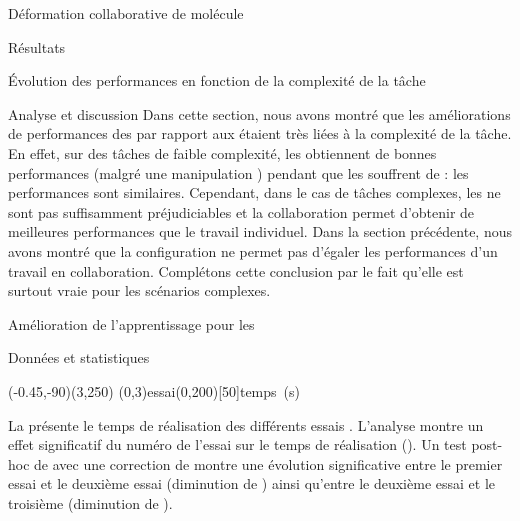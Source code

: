 \documentclass[myfrancais,ngerman,english,frenchb]{mythesis}
\begin{document}
\begin{mychapter}{Déformation collaborative de molécule}
\begin{mysection}{Résultats}
\begin{mysubsection}{Évolution des performances en fonction de la complexité de la tâche}
\begin{mysubsubsection}{Analyse et discussion}
					Dans cette section, nous avons montré que les améliorations de performances des  par rapport aux  étaient très liées à la complexité de la tâche.
					En effet, sur des tâches de faible complexité, les  obtiennent de bonnes performances (malgré une manipulation ) pendant que les  souffrent de  : les performances sont similaires.
					Cependant, dans le cas de tâches complexes, les  ne sont pas suffisamment préjudiciables et la collaboration permet d'obtenir de meilleures performances que le travail individuel.
					Dans la section précédente, nous avons montré que la configuration  ne permet pas d'égaler les performances d'un travail en collaboration.
					Complétons cette conclusion par le fait qu'elle est surtout vraie pour les scénarios complexes.
				\end{mysubsubsection}
			\end{mysubsection}
			\begin{mysubsection}{Amélioration de l'apprentissage pour les }
				\begin{mysubsubsection}{Données et statistiques}
					\begin{myfigure}
						\begin{myps}(-0.45,-90)(3,250)
							\myaxes(0,3){essai}(0,200)[50]{temps~(s)}
						\end{myps}
					\end{myfigure}

					La  présente le temps de réalisation  des différents essais .
					L'analyse montre un effet significatif du numéro de l'essai  sur le temps de réalisation  ().
					Un test post-hoc de  avec une correction de  montre une évolution significative entre le premier essai et le deuxième essai (diminution de ) ainsi qu'entre le deuxième essai et le troisième (diminution de ).


\end{mysubsubsection}
\end{mysubsection}
\end{mysection}
\end{mychapter}
\end{document}
